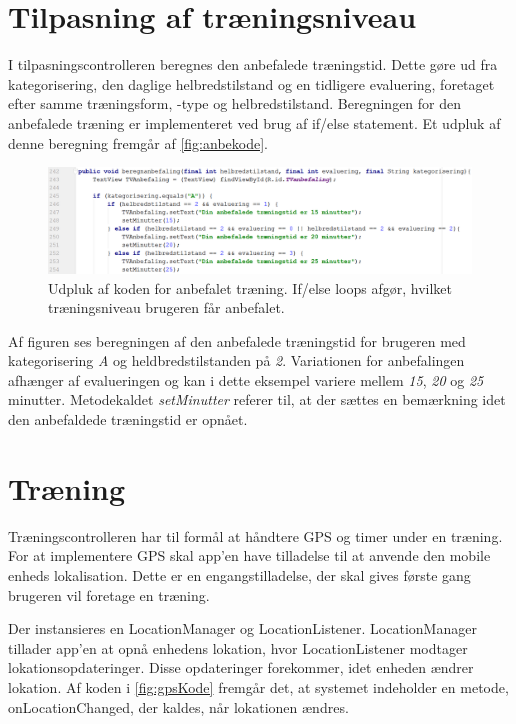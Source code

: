 \section{Tilpasning af træningsniveau}
I tilpasningscontrolleren beregnes den anbefalede træningstid. Dette gøre ud fra kategorisering, den daglige helbredstilstand og en tidligere evaluering, foretaget efter samme træningsform, -type og helbredstilstand.
Beregningen for den anbefalede træning er implementeret ved brug af if/else statement. Et udpluk af denne beregning fremgår af \autoref{fig:anbekode}.  
   
\begin{figure} [H]
\centering
\includegraphics[width=1\textwidth]{figures/imple/anbekode}
\caption{Udpluk af koden for anbefalet træning. If/else loops afgør, hvilket træningsniveau brugeren får anbefalet.}
\label{fig:anbekode}
\end{figure} 

\noindent
Af figuren ses beregningen af den anbefalede træningstid for brugeren med kategorisering \textit{A} og heldbredstilstanden på \textit{2}. Variationen for anbefalingen afhænger af evalueringen og kan i dette eksempel variere mellem \textit{15}, \textit{20} og \textit{25}  minutter. Metodekaldet \textit{setMinutter} referer til, at der sættes en bemærkning idet den anbefaldede træningstid er opnået.

\section{Træning}
Træningscontrolleren har til formål at håndtere GPS og timer under en træning. For at implementere GPS skal app'en have tilladelse til at anvende den mobile enheds lokalisation. Dette er en engangstilladelse, der skal gives første gang brugeren vil foretage en træning. 

Der instansieres en LocationManager og LocationListener. LocationManager tillader app'en at opnå enhedens lokation, hvor LocationListener modtager lokationsopdateringer. Disse opdateringer forekommer, idet enheden ændrer lokation.\cite{} Af koden i \autoref{fig:gpsKode} fremgår det, at systemet indeholder en metode, onLocationChanged, der kaldes, når lokationen ændres. 

